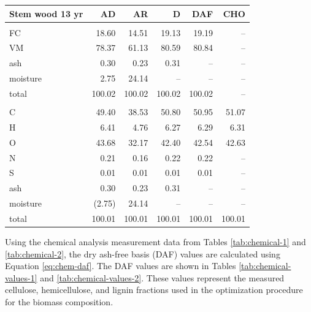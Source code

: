 \begin{longtable}{lrrrrr}
    \textbf{Stem wood 13 yr} & AD & AR & D & DAF & CHO \\
    \hline \\
    FC       & 18.60  & 14.51  & 19.13  & 19.19  & -- \\
    VM       & 78.37  & 61.13  & 80.59  & 80.84  & -- \\
    ash      & 0.30   & 0.23   & 0.31   & --     & -- \\
    moisture & 2.75   & 24.14  & --     & --     & -- \\
    total    & 100.02 & 100.02 & 100.02 & 100.02 & -- \\
    \\
    C        & 49.40  & 38.53  & 50.80  & 50.95  & 51.07 \\
    H        & 6.41   & 4.76   & 6.27   & 6.29   & 6.31 \\
    O        & 43.68  & 32.17  & 42.40  & 42.54  & 42.63 \\
    N        & 0.21   & 0.16   & 0.22   & 0.22   & -- \\
    S        & 0.01   & 0.01   & 0.01   & 0.01   & -- \\
    ash      & 0.30   & 0.23   & 0.31   & --     & -- \\
    moisture & (2.75) & 24.14  & --     & --     & -- \\
    total    & 100.01 & 100.01 & 100.01 & 100.01 & 100.01 \\
\end{longtable}

Using the chemical analysis measurement data from Tables \ref{tab:chemical-1} and \ref{tab:chemical-2}, the dry ash-free basis (DAF) values are calculated using Equation \ref{eq:chem-daf}. The DAF values are shown in Tables \ref{tab:chemical-values-1} and \ref{tab:chemical-values-2}. These values represent the measured cellulose, hemicellulose, and lignin fractions used in the optimization procedure for the biomass composition.

